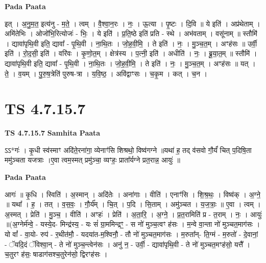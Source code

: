 \documentclass[17pt]{extarticle}
\begin{document}
\textbf{Pada Paata} \newline

इत् । अ॒नु॒म॒त॒ इत्य॑नु - म॒ते॒ । त्वम् । वै॒श्वा॒न॒रः । नः॒ । ऊ॒त्या । पृ॒ष्टः । दि॒वि ॥ ये इति॑ । अप्र॑थेताम् । अमि॑तेभिः । ओजो॑भि॒रित्योजः॑ - भिः॒ । ये इति॑ । प्र॒ति॒ष्ठे इति॑ प्रति - स्थे । अभ॑वताम् । वसू॑नाम् ॥ स्तौमि॑ । द्यावा॑पृथि॒वी इति॒ द्यावा᳚ - पृ॒थि॒वी । ना॒थि॒तः । जो॒ह॒वी॒मि॒ । ते इति॑ । नः॒ । मु॒ञ्च॒त॒म् । अꣳह॑सः ॥ उर्वी॒ इति॑ । रो॒द॒सी॒ इति॑ । वरि॑वः । कृ॒णो॒त॒म् । क्षेत्र॑स्य । प॒त्नी॒ इति॑ । अधीति॑ । नः॒ । ब्रू॒या॒त॒म् ॥ स्तौमि॑ । द्यावा॑पृथि॒वी इति॒ द्यावा᳚ - पृ॒थि॒वी । ना॒थि॒तः । जो॒ह॒वी॒मि॒ । ते इति॑ । नः॒ । मु॒ञ्च॒त॒म् । अꣳह॑सः ॥ यत् । ते॒ । व॒यम् । पु॒रु॒ष॒त्रेति॑ पुरुष-त्रा । य॒वि॒ष्ठ॒ । अवि॑द्वाꣳसः । च॒कृ॒म । कत् । च॒न ।  \newline





\section{ TS 4.7.15.7 }

\textbf{TS 4.7.15.7 } \newline
\textbf{Samhita Paata} \newline

ऽऽ*गः॑ । कृ॒धी स्व॑स्माꣳ अदि॑ते॒रना॑गा॒ व्येनाꣳ॑सि शिश्रथो॒ विष्व॑गग्ने ॥यथा॑ ह॒ तद् व॑सवो गौ॒र्यं॑ चित् प॒दिषि॒ता ममु॑ञ्चता यजत्राः ।ए॒वा त्वम॒स्मत् प्रमु॑ञ्चा॒ व्यꣳहः॒ प्राता᳚र्यग्ने प्रत॒रान्न॒ आयुः॑ ॥ \newline

\textbf{Pada Paata} \newline

आगः॑ ॥ कृ॒धि । स्विति॑ । अ॒स्मान् । अदि॑तेः । अना॑गाः । वीति॑ । एनाꣳ॑सि । शि॒श्र॒थः॒ । विष्व॑क् । अ॒ग्ने॒ ॥ यथा᳚ । ह॒ । तत् । व॒स॒वः॒ । गौ॒र्य᳚म् । चि॒त् । प॒दि । सि॒ताम् । अमु॑ञ्चत । य॒ज॒त्राः॒ ॥ ए॒वा । त्वम् । अ॒स्मत् । प्रेति॑ । मु॒ञ्च॒ । वीति॑ । अꣳहः॑ । प्रेति॑ । अ॒ता॒रि॒ । अ॒ग्ने॒ । प्र॒त॒रामिति॑ प्र - त॒राम् । नः॒ । आयुः॑ ॥(अ॒ग्नेर्म॑न्वे॒ - यस्ये॒द- मिन्द्र॑स्य॒ - यः सं॑ ग्रा॒ममिन्द्रꣳ॒॒ - स नो॑ मुञ्च॒त्वꣳ ह॑सः । म॒न्वे वा॒न्ता नो॑ मुञ्चत॒माग॑सः । यो वां᳚ - वा॒यो- रुप॑ - र॒थीत॑मौ॒ - यदया॑त-म॒श्विनौ॒ - तौ नो॑ मुञ्चत॒माग॑सः । म॒रुता᳚न्- ति॒ग्मं - म॒रुतो॑ - दे॒वानां॒ - ॅयदि॒दं ॅविश्वा॒न् - ते नो॑ मुञ्च॒न्त्वेन॑सः । अनु॑ न॒ - उर्वी॒ - द्यावा॑पृथि॒वी - ते नो॑ मुञ्चत॒मꣳह॑सो॒ यत्तै᳚ । च॒तुरꣳ ह॑सः॒ षाडाग॑सश्च॒तुरेन॑सो॒ द्विरꣳह॑सः ।  \newline
\end{document}
